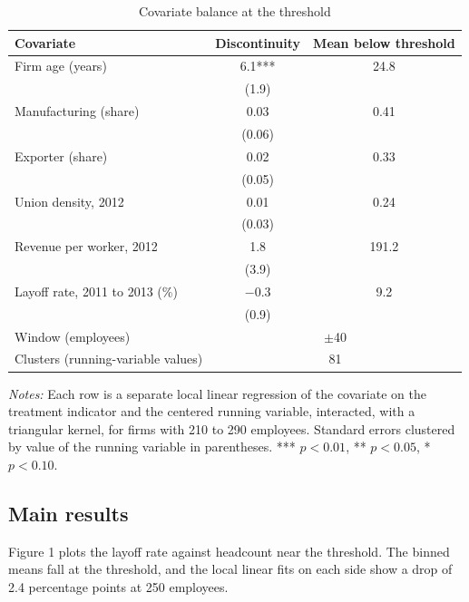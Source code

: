 \documentclass[12pt]{article}
\begin{document}
\begin{table}[htbp]
\centering
\begin{threeparttable}
\caption{Covariate balance at the threshold}
\begin{tabular}{lcc}
\toprule
Covariate & Discontinuity & Mean below threshold \\
\midrule
Firm age (years) & 6.1*** & 24.8 \\
 & (1.9) & \\
Manufacturing (share) & 0.03 & 0.41 \\
 & (0.06) & \\
Exporter (share) & 0.02 & 0.33 \\
 & (0.05) & \\
Union density, 2012 & 0.01 & 0.24 \\
 & (0.03) & \\
Revenue per worker, 2012 & 1.8 & 191.2 \\
 & (3.9) & \\
Layoff rate, 2011 to 2013 (\%) & $-$0.3 & 9.2 \\
 & (0.9) & \\
\midrule
Window (employees) & \multicolumn{2}{c}{$\pm$40} \\
Clusters (running-variable values) & \multicolumn{2}{c}{81} \\
\bottomrule
\end{tabular}
\begin{tablenotes}\footnotesize
\item \emph{Notes:} Each row is a separate local linear regression of the covariate on the treatment indicator and the centered running variable, interacted, with a triangular kernel, for firms with 210 to 290 employees. Standard errors clustered by value of the running variable in parentheses. *** $p<0.01$, ** $p<0.05$, * $p<0.10$.
\end{tablenotes}
\end{threeparttable}
\end{table}

\subsection{Main results}

Figure 1 plots the layoff rate against headcount near the threshold. The binned means fall at the threshold, and the local linear fits on each side show a drop of 2.4 percentage points at 250 employees.
\end{document}
